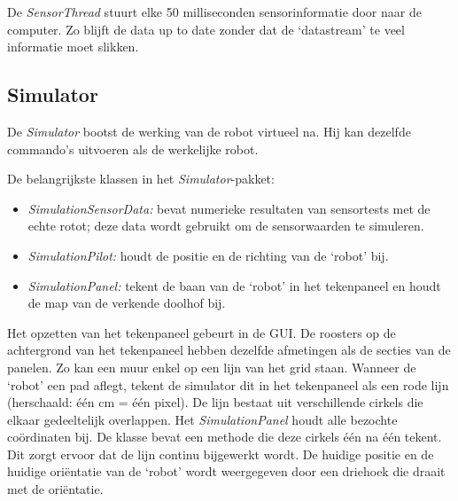 \documentclass[eind]{penoverslag}
\begin{document}
De \textit{SensorThread} stuurt elke 50 milliseconden sensorinformatie door naar de computer. Zo blijft de data up to date zonder dat de `datastream' te veel informatie moet slikken.

\subsection{Simulator} %
\label{ssec:simulator}
De \textit{Simulator} bootst de werking van de robot virtueel na. Hij kan dezelfde commando's uitvoeren als de werkelijke robot.

De belangrijkste klassen in het \textit{Simulator}-pakket:

\begin{itemize}
\item \textit{SimulationSensorData:} bevat numerieke resultaten van sensortests met de echte rotot; deze data wordt gebruikt om de sensorwaarden te simuleren.
\item \textit{SimulationPilot:} houdt de positie en de richting van de `robot' bij.
\item \textit{SimulationPanel:} tekent de baan van de `robot' in het tekenpaneel en houdt de map van de verkende doolhof bij.
\end{itemize}

Het opzetten van het tekenpaneel gebeurt in de GUI. De roosters op de achtergrond van het tekenpaneel hebben dezelfde afmetingen als de secties van de panelen. Zo kan een muur enkel op een lijn van het grid staan.
Wanneer de `robot' een pad aflegt, tekent de simulator dit in het tekenpaneel als een rode lijn (herschaald: \'e\'en cm = \'e\'en pixel). De lijn  bestaat uit verschillende cirkels die elkaar gedeeltelijk overlappen. Het \textit{SimulationPanel} houdt alle bezochte co\"ordinaten bij. De klasse bevat een methode die deze cirkels \'e\'en na \'e\'en tekent. Dit zorgt ervoor dat de lijn continu bijgewerkt wordt. De huidige positie en de huidige ori\"entatie van de `robot' wordt weergegeven door een driehoek die draait met de ori\"entatie.

\end{document}

